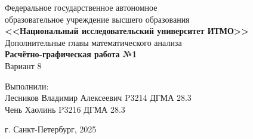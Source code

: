 \begin{titlepage}
    \centering
    Федеральное государственное автономное \\
    образовательное учреждение высшего образования \\
    \textbf{<<Национальный исследовательский университет ИТМО>>} \\

    \vfill
    Дополнительные главы математического анализа \\
    \vspace{0.5\baselineskip}
    \textbf{Расчётно-графическая работа №1} \\
    \vspace{0.5\baselineskip}
    Вариант 8 \\

    \vfill

    \flushright
    Выполнили:\\ 
    Лесников Владимир Алексеевич P3214 ДГМА 28.3\\
    Чень Хаолинь P3216 ДГМА 28.3\\

    \vspace{4\baselineskip}
    
    \centering
    г. Санкт-Петербург, 2025

\end{titlepage}